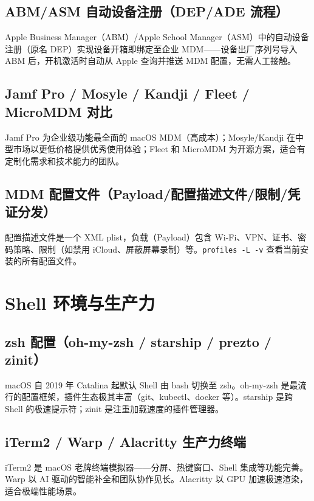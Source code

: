 \documentclass[12pt,UTF8]{ctexbook}
\begin{document}
    \subsection{ABM/ASM 自动设备注册（DEP/ADE 流程）}

Apple Business Manager（ABM）/Apple School Manager（ASM）中的自动设备注册（原名 DEP）实现设备开箱即绑定至企业 MDM——设备出厂序列号导入 ABM 后，开机激活时自动从 Apple 查询并推送 MDM 配置，无需人工接触。

    \subsection{Jamf Pro / Mosyle / Kandji / Fleet / MicroMDM 对比}

Jamf Pro 为企业级功能最全面的 macOS MDM（高成本）；Mosyle/Kandji 在中型市场以更低价格提供优秀使用体验；Fleet 和 MicroMDM 为开源方案，适合有定制化需求和技术能力的团队。

    \subsection{MDM 配置文件（Payload/配置描述文件/限制/凭证分发）}

配置描述文件是一个 XML plist，负载（Payload）包含 Wi-Fi、VPN、证书、密码策略、限制（如禁用 iCloud、屏蔽屏幕录制）等。\verb|profiles -L -v| 查看当前安装的所有配置文件。

  \section{Shell 环境与生产力}
    \subsection{zsh 配置（oh-my-zsh / starship / prezto / zinit）}

macOS 自 2019 年 Catalina 起默认 Shell 由 bash 切换至 zsh。oh-my-zsh 是最流行的配置框架，插件生态极其丰富（git、kubectl、docker 等）。starship 是跨 Shell 的极速提示符；zinit 是注重加载速度的插件管理器。

    \subsection{iTerm2 / Warp / Alacritty 生产力终端}

iTerm2 是 macOS 老牌终端模拟器——分屏、热键窗口、Shell 集成等功能完善。Warp 以 AI 驱动的智能补全和团队协作见长。Alacritty 以 GPU 加速极速渲染，适合极端性能场景。
\end{document}
